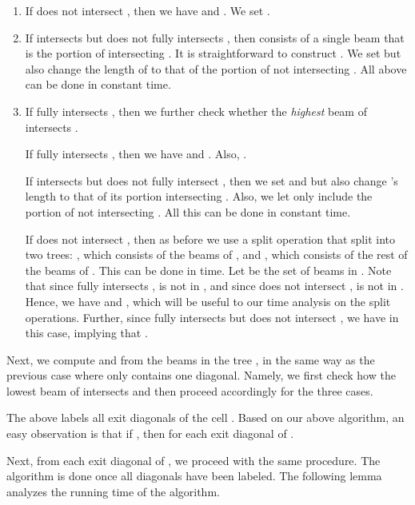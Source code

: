 \documentclass[english,runningheads,11pt]{llncs-revised}
\begin{document}
\begin{enumerate}
\item
If  does not intersect , then we have  and
. We set .

\item
If  intersects  but does not fully intersects , then  consists of a
single beam that is the portion of  intersecting .
It is straightforward to construct .
We set  but also change the length of  to that of the portion of 
not intersecting . All above can be done in constant time.

\item
If  fully intersects , then we further check whether the
{\em highest} beam  of  intersects .

If  fully intersects , then we have  and
. Also, .

If  intersects  but does not fully intersect , then we
set  and  but also change 's length to
that of its portion intersecting . Also, we let   only
include the portion of  not intersecting . All this can be done in constant time.

If  does not intersect ,
then as before we use a split operation that split
 into two trees: , which consists of the beams of
, and ,
which consists of the rest of the beams of . This can be done in  time.
Let  be the set of beams in .
Note that since  fully intersects , 
is not in , and since  does not intersect ,  is
not in . Hence, we have  and , which will be useful to our time analysis on the split operations. Further, since  fully intersects  but  does not intersect , we have  in this case, implying that .
\end{enumerate}

Next, we compute  and  from the beams in the tree , in
the same way as the previous case where  only contains one
diagonal. Namely, we first check how the lowest beam of 
intersects  and then proceed accordingly for the three cases.


The above labels all exit diagonals of the cell . Based on our above algorithm, an easy observation is that if , then  for each exit diagonal  of .

Next, from each exit diagonal of ,
we proceed with the same procedure. The algorithm is done once
all diagonals have been labeled. The following lemma analyzes the running time of the algorithm.
\end{document}
